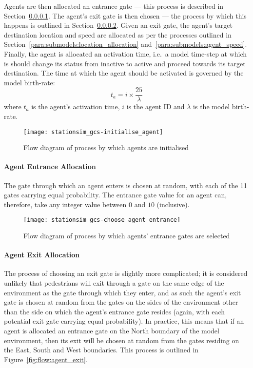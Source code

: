 Agents are then allocated an entrance gate --- this process is described in
Section~\ref{para:submodels:agent_entrance}.
The agent's exit gate is then chosen --- the process by which this happens is
outlined in Section~\ref{para:submodels:agent_exit}.
Given an exit gate, the agent's target destination location and speed are
allocated as per the processes outlined in
Section~\ref{para:submodels:location_allocation}
and~\ref{para:submodels:agent_speed}.
Finally, the agent is allocated an activation time, i.e.\ a model time-step at
which is should change its status from inactive to active and proceed towards
its target destination.
The time at which the agent should be activated is governed by the model
birth-rate:
\begin{equation}
    t_{a} = i \times \frac{25}{\lambda}
\end{equation}
where $t_{a}$ is the agent's activation time, $i$ is the agent ID and $\lambda$
is the model birth-rate.

\begin{figure}[h]
    \centering
    \texttt{[image: stationsim\_gcs-initialise\_agent]}
    \caption{Flow diagram of process by which agents are
    initialised}\label{fig:flow:agent_initialisation}
\end{figure}

\paragraph{Agent Entrance Allocation}\label{para:submodels:agent_entrance}

The gate through which an agent enters is chosen at random, with each of the 11
gates carrying equal probability.
The entrance gate value for an agent can, therefore, take any integer value
between $0$ and $10$ (inclusive).

\begin{figure}[h]
    \centering
    \texttt{[image: stationsim\_gcs-choose\_agent\_entrance]}
    \caption{Flow diagram of process by which agents' entrance gates are
    selected}\label{fig:flow:agent_entrance}
\end{figure}

\paragraph{Agent Exit Allocation}\label{para:submodels:agent_exit}

The process of choosing an exit gate is slightly more complicated; it is
considered unlikely that pedestrians will exit through a gate on the same edge
of the environment as the gate through which they enter, and as such the agent's
exit gate is chosen at random from the gates on the sides of the environment
other than the side on which the agent's entrance gate resides (again, with each
potential exit gate carrying equal probability).
In practice, this means that if an agent is allocated an entrance gate on the
North boundary of the model environment, then its exit will be chosen at random
from the gates residing on the East, South and West boundaries.
This process is outlined in Figure~\ref{fig:flow:agent_exit}.

